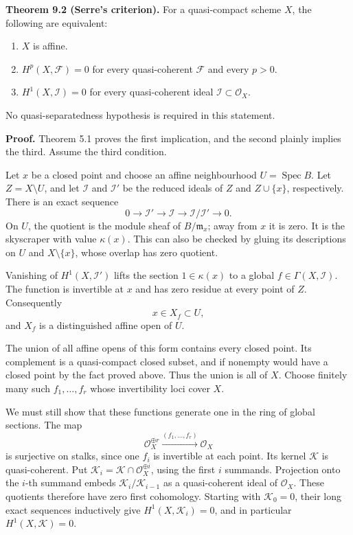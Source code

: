 \documentclass[11pt,a4paper,openany]{report}
\newcounter{none}
\providecommand{\tightlist}{\setlength{\itemsep}{0pt}\setlength{\parskip}{0pt}}
\begin{document}
\textbf{Theorem 9.2 (Serre's criterion).} For a quasi-compact scheme \(X\), the following are equivalent:

\begin{enumerate}
\def\labelenumi{\arabic{enumi}.}
\tightlist
\item
  \(X\) is affine.
\item
  \(H^p(X,\mathcal F)=0\) for every quasi-coherent \(\mathcal F\) and every \(p>0\).
\item
  \(H^1(X,\mathcal I)=0\) for every quasi-coherent ideal \(\mathcal I\subset\mathcal O_X\).
\end{enumerate}

No quasi-separatedness hypothesis is required in this statement.

\textbf{Proof.} Theorem 5.1 proves the first implication, and the second plainly implies the third. Assume the third condition.

Let \(x\) be a closed point and choose an affine neighbourhood \(U=\operatorname{Spec}B\). Let \(Z=X\setminus U\), and let \(\mathcal I\) and \(\mathcal I'\) be the reduced ideals of \(Z\) and \(Z\cup\{x\}\), respectively. There is an exact sequence \[
0\to\mathcal I'\to\mathcal I\to\mathcal I/\mathcal I'\to0.
\] On \(U\), the quotient is the module sheaf of \(B/\mathfrak m_x\); away from \(x\) it is zero. It is the skyscraper with value \(\kappa(x)\). This can also be checked by gluing its descriptions on \(U\) and \(X\setminus\{x\}\), whose overlap has zero quotient.

Vanishing of \(H^1(X,\mathcal I')\) lifts the section \(1\in\kappa(x)\) to a global \(f\in\Gamma(X,\mathcal I)\). The function is invertible at \(x\) and has zero residue at every point of \(Z\). Consequently \[
x\in X_f\subset U,
\] and \(X_f\) is a distinguished affine open of \(U\).

The union of all affine opens of this form contains every closed point. Its complement is a quasi-compact closed subset, and if nonempty would have a closed point by the fact proved above. Thus the union is all of \(X\). Choose finitely many such \(f_1,\ldots,f_r\) whose invertibility loci cover \(X\).

We must still show that these functions generate one in the ring of global sections. The map \[
\mathcal O_X^{\oplus r}\xrightarrow{(f_1,\ldots,f_r)}\mathcal O_X
\] is surjective on stalks, since one \(f_i\) is invertible at each point. Its kernel \(\mathcal K\) is quasi-coherent. Put \(\mathcal K_i=\mathcal K\cap\mathcal O_X^{\oplus i}\), using the first \(i\) summands. Projection onto the \(i\)-th summand embeds \(\mathcal K_i/\mathcal K_{i-1}\) as a quasi-coherent ideal of \(\mathcal O_X\). These quotients therefore have zero first cohomology. Starting with \(\mathcal K_0=0\), their long exact sequences inductively give \(H^1(X,\mathcal K_i)=0\), and in particular \(H^1(X,\mathcal K)=0\).
\end{document}
